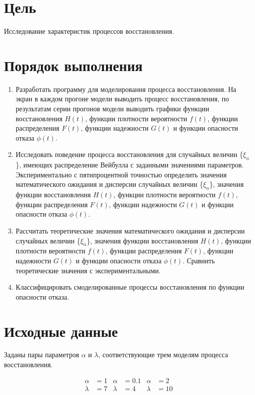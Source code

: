 \section*{Цель}

Исследование характеристик процессов восстановления.

\section*{Порядок выполнения}

\begin{enumerate}
    \item Разработать программу для моделирования процесса восстановления.
    На экран в каждом прогоне модели выводить процесс восстановления, по результатам серии прогонов модели выводить
    графики функции восстановления $H(t)$, функции плотности вероятности $f(t)$, функции распределения $F(t)$,
    функции надежности $G(t)$ и функции опасности отказа $\phi(t)$.
    \item Исследовать поведение процесса восстановления для случайных величин \{$\xi_n$\}, имеющих распределение Вейбулла
    с заданными значениями параметров.
    Экспериментально с пятипроцентной точностью определить значения математического ожидания и дисперсии случайных
    величин \{$\xi_n$\}, значения функции восстановления $H(t)$, функции плотности вероятности $f(t)$, функции
    распределения $F(t)$, функции надежности $G(t)$ и функции опасности отказа $\phi(t)$.
    \item Рассчитать теоретические значения математического ожидания и дисперсии случайных величин \{$\xi_n$\},
    значения функции восстановления $H(t)$, функции плотности вероятности $f(t)$, функции распределения $F(t)$,
    функции надежности $G(t)$ и функции опасности отказа $\phi(t)$.
    Сравнить теоретические значения с экспериментальными.
    \item Классифицировать смоделированные процессы восстановления по функции опасности отказа.
\end{enumerate}

\section*{Исходные данные}

Заданы пары параметров $\alpha$ и $\lambda$, соответствующие трем моделям процесса восстановления.

\begin{align*}
    \alpha & = 1 & \alpha & = 0.1 & \alpha & = 2 \\
    \lambda & = 7 & \lambda & = 4 & \lambda & = 10
\end{align*}

